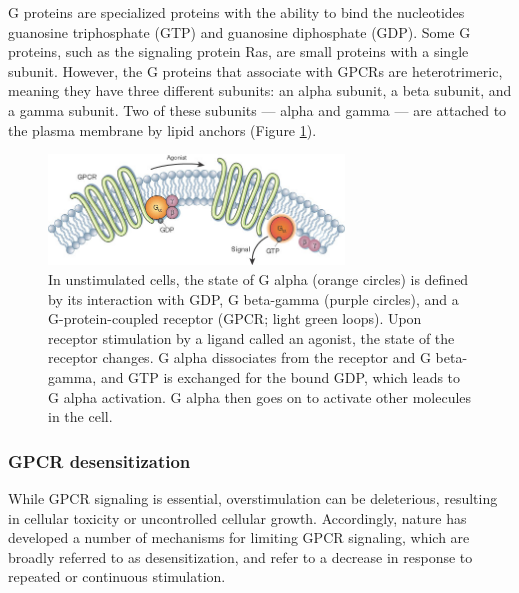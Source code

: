 \documentclass{book}
\begin{document}
G proteins are specialized proteins with the ability to bind the nucleotides guanosine triphosphate (GTP) and guanosine diphosphate (GDP). 
Some G proteins, such as the signaling protein Ras, are small proteins with a single subunit. However, the G proteins that associate with GPCRs are heterotrimeric, meaning they have three different subunits: an alpha subunit, a beta subunit, and a gamma subunit. Two of these subunits — alpha and gamma — are attached to the plasma membrane by lipid anchors (Figure \ref{fig:GPCR}).

\begin{figure}[H]
   \centering
   \includegraphics[width=0.7\textwidth]{images3/image2.png}
   \caption{\label{fig:GPCR} In unstimulated cells, the state of G alpha (orange circles) is defined by its interaction with GDP, G beta-gamma (purple circles), and a G-protein-coupled receptor (GPCR; light green loops). Upon receptor stimulation by a ligand called an agonist, the state of the receptor changes. G alpha dissociates from the receptor and G beta-gamma, and GTP is exchanged for the bound GDP, which leads to G alpha activation. G alpha then goes on to activate other molecules in the cell.}
\end{figure}

\subsubsection{GPCR desensitization}
While GPCR signaling is essential, overstimulation can be deleterious, resulting in cellular toxicity or uncontrolled cellular growth. 
Accordingly, nature has developed a number of mechanisms for limiting GPCR signaling, which are broadly referred to as desensitization, and refer to a decrease in response to repeated or continuous stimulation. 





\printbibliography
\end{document}
